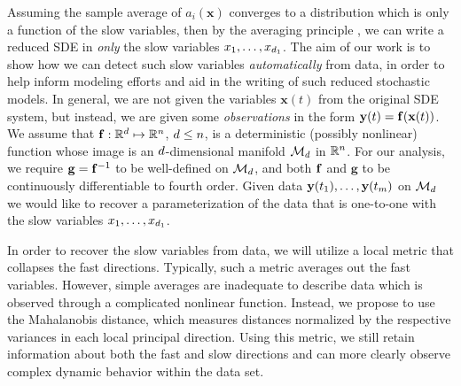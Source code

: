Assuming the sample average of $a_i(\mathbf{x})$ converges to a distribution which is only a function of the slow variables, then by the averaging principle \cite{freidlin2012random}, we can write a reduced SDE in {\em only} the slow variables $x_1, \dots, x_{{d_1}}$.
%
The aim of our work is to show how we can detect such slow variables {\em automatically} from data, in order to help inform modeling efforts and aid in the writing of such reduced stochastic models.
%
In general, we are not given the variables $\mathbf{x}(t)$ from the original SDE system, but instead, we are given some {\em observations}
 in the form $\mathbf{y}(t) = \mathbf{f} (\mathbf{x}(t))$.
%
We assume that $\mathbf{f}: \mathbb{R}^d \mapsto \mathbb{R}^n$, $d \le n$, is a deterministic (possibly nonlinear) function whose image is an $d$-dimensional manifold $\mathcal{M}_d$ in $\mathbb{R}^n$.
%
%
For our analysis, we require $\mathbf{g} = \mathbf{f} ^{-1}$ to be well-defined on $\mathcal{M}_d$, and both $\mathbf{f}$ and $\mathbf{g}$ to be continuously differentiable to fourth order.
%
Given data $\mathbf{y}(t_1),\ldots,\mathbf{y}(t_m)$ on $\mathcal{M}_d$ we would like to recover a parameterization of the data that is one-to-one with the
slow variables $x_1, \dots, x_{d_1}$.


In order to recover the slow variables from data, we will utilize a local metric that collapses the fast directions.
%
Typically, such a metric averages out the fast variables.
%
However, simple averages are inadequate to describe data which is observed through a complicated nonlinear function.
%
Instead, we propose to use the Mahalanobis distance, which measures distances normalized by the respective variances in each local principal direction.
%
Using this metric, we still retain information about both the fast and slow directions and can
more clearly observe complex dynamic behavior within the data set.

